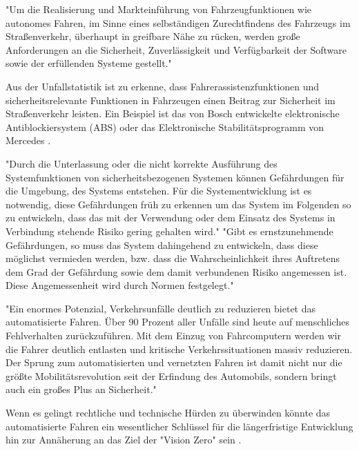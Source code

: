 "Um die Realisierung und Markteinführung von Fahrzeugfunktionen wie autonomes Fahren, im Sinne eines selbständigen Zurechtfindens des Fahrzeugs im Straßenverkehr, überhaupt in greifbare Nähe zu rücken, werden große Anforderungen an die Sicherheit, Zuverlässigkeit und Verfügbarkeit der Software sowie der erfüllenden Systeme gestellt." \parencite[S.3]{Hillenbrand.2012} %

Aus der Unfallstatistik ist zu erkenne, dass Fahrerassistenzfunktionen und sicherheitsrelevante Funktionen in Fahrzeugen einen Beitrag zur Sicherheit im Straßenverkehr leisten. Ein Beispiel ist das von Bosch entwickelte elektronische Antiblockiersystem (ABS) oder das Elektronische Stabilitätsprogramm von Mercedes \parencite[S.4]{Hillenbrand.2012}.

"Durch die Unterlassung oder die nicht korrekte Ausführung des Systemfunktionen von sicherheitsbezogenen Systemen können Gefährdungen für die Umgebung, des Systems entstehen. Für die Systementwicklung ist es notwendig, diese Gefährdungen früh zu erkennen um das System im Folgenden so zu entwickeln, dass das mit der Verwendung oder dem Einsatz des Systems in Verbindung stehende Risiko gering gehalten wird." \parencite[S.49]{Hillenbrand.2012}
"Gibt es ernstzunehmende Gefährdungen, so muss das System dahingehend zu entwickeln, dass diese möglichst vermieden werden, bzw. dass die Wahrscheinlichkeit ihres Auftretens dem Grad der Gefährdung sowie dem damit verbundenen Risiko angemessen ist. Diese Angemessenheit wird durch Normen festgelegt." \parencite[S.50]{Hillenbrand.2012} %

"Ein enormes Potenzial, Verkehrsunfälle deutlich zu reduzieren bietet das automatisierte Fahren. Über 90 Prozent  aller Unfälle sind heute auf menschliches Fehlverhalten zurückzuführen. Mit dem Einzug von Fahrcomputern werden wir die Fahrer deutlich entlasten und kritische Verkehrssituationen massiv reduzieren. Der Sprung zum automatisierten und vernetzten Fahren ist damit nicht nur die größte Mobilitätsrevolution seit der Erfindung des Automobils, sondern bringt auch ein großes Plus an Sicherheit." \parencite[S.4]{DEKRA.2017}

Wenn es gelingt rechtliche und technische Hürden zu überwinden könnte das automatisierte Fahren ein wesentlicher Schlüssel für die längerfristige Entwicklung hin zur Annäherung an das Ziel der "Vision Zero" sein \parencite[S.16]{DEKRA.2017}.

